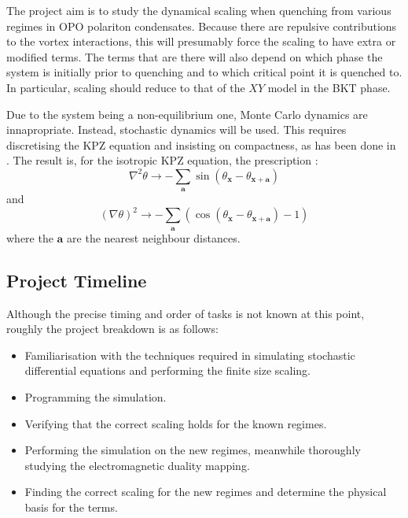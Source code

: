 \documentclass[letterpaper, 10 pt, conference]{IEEEtran}  %
\newcommand{\myvec}[1]{\boldsymbol{#1}}
\begin{document}
The project aim is to study the dynamical scaling when quenching from various regimes in OPO polariton condensates.  
Because there are repulsive contributions to the vortex interactions, this will presumably force the scaling to have extra or modified terms. 
The terms that are there will also depend on which phase the system is initially prior to quenching and to which critical point it is quenched to. 
In particular, scaling should reduce to that of the $XY$ model in the BKT phase.

Due to the system being a non-equilibrium one, Monte Carlo dynamics are innapropriate.
Instead, stochastic dynamics will be used. 
This requires discretising the KPZ equation and insisting on compactness, as has been done in \cite{PhysRevB.94.104521}. The result is, for the isotropic KPZ equation, the prescription \cite{PhysRevB.94.104521}: 
\[
	\nabla^2 \theta \to - \sum_{\myvec{a}} \sin ( \theta_{\myvec{x}} - \theta_{\myvec{x} + \myvec{a}})
\]
and
\[
	(\nabla \theta )^2 \to - \sum_{\myvec{a}} ( \cos ( \theta_{\myvec{x}} - \theta_{\myvec{x} + \myvec{a}}) - 1 )
\]
where the $\myvec{a}$ are the nearest neighbour distances.

\subsection{Project Timeline}

Although the precise timing and order of tasks is not known at this point, roughly the project breakdown is as follows:

\begin{itemize}
\item Familiarisation with the techniques required in simulating stochastic differential equations and performing the finite size scaling.
\item Programming the simulation.
\item Verifying that the correct scaling holds for the known regimes.
\item Performing the simulation on the new regimes, meanwhile thoroughly studying the electromagnetic duality mapping.
\item Finding the correct scaling for the new regimes and determine the physical basis for the terms.
\end{itemize}
\newpage
\printbibliography
\end{document}
